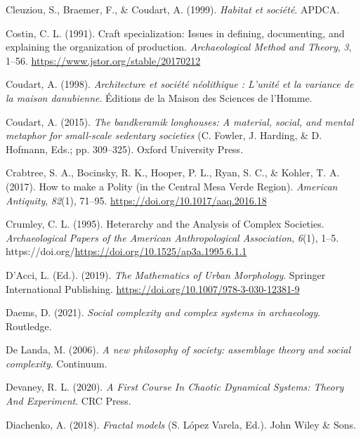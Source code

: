\documentclass[
  12pt,
]{book}
\newlength{\cslhangindent}
\newlength{\cslentryspacingunit} %
\newenvironment{CSLReferences}[2] %
 {%
  \setlength{\parindent}{0pt}
  \ifodd #1
  \let\oldpar\par
  \def\par{\hangindent=\cslhangindent\oldpar}
  \fi
  \setlength{\parskip}{#2\cslentryspacingunit}
 }%
 {}
\begin{document}
\begin{CSLReferences}{1}{0}
\leavevmode{}%
Cleuziou, S., Braemer, F., \& Coudart, A. (1999). \emph{Habitat et société}. APDCA.

\leavevmode{}%
Costin, C. L. (1991). Craft specialization: Issues in defining, documenting, and explaining the organization of production. \emph{Archaeological Method and Theory}, \emph{3}, 1--56. \url{https://www.jstor.org/stable/20170212}

\leavevmode{}%
Coudart, A. (1998). \emph{Architecture et société néolithique : L'unité et la variance de la maison danubienne}. Éditions de la Maison des Sciences de l'Homme.

\leavevmode{}%
Coudart, A. (2015). \emph{The bandkeramik longhouses: A material, social, and mental metaphor for small-scale sedentary societies} (C. Fowler, J. Harding, \& D. Hofmann, Eds.; pp. 309--325). Oxford University Press.

\leavevmode{}%
Crabtree, S. A., Bocinsky, R. K., Hooper, P. L., Ryan, S. C., \& Kohler, T. A. (2017). How to make a Polity (in the Central Mesa Verde Region). \emph{American Antiquity}, \emph{82}(1), 71--95. \url{https://doi.org/10.1017/aaq.2016.18}

\leavevmode{}%
Crumley, C. L. (1995). Heterarchy and the Analysis of Complex Societies. \emph{Archaeological Papers of the American Anthropological Association}, \emph{6}(1), 1--5. https://doi.org/\url{https://doi.org/10.1525/ap3a.1995.6.1.1}

\leavevmode{}%
D'Acci, L. (Ed.). (2019). \emph{The Mathematics of Urban Morphology}. Springer International Publishing. \url{https://doi.org/10.1007/978-3-030-12381-9}

\leavevmode{}%
Daems, D. (2021). \emph{Social complexity and complex systems in archaeology}. Routledge.

\leavevmode{}%
De Landa, M. (2006). \emph{A new philosophy of society: assemblage theory and social complexity}. Continuum.

\leavevmode{}%
Devaney, R. L. (2020). \emph{A First Course In Chaotic Dynamical Systems: Theory And Experiment}. CRC Press.

\leavevmode{}%
Diachenko, A. (2018). \emph{Fractal models} (S. López Varela, Ed.). John Wiley \& Sons.


\end{CSLReferences}
\end{document}
